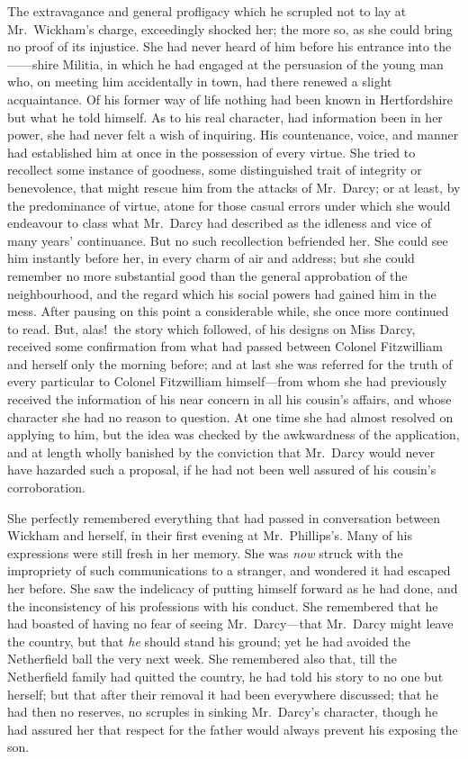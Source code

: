 \documentclass[12pt,english,oneside]{book}
\begin{document}
The extravagance and general profligacy which he scrupled not to lay
at Mr.\ Wickham's charge, exceedingly shocked her; the more so, as
she could bring no proof of its injustice. She had never heard of
him before his entrance into the \mbox{------}shire Militia, in which
he had engaged at the persuasion of the young man who, on meeting
him accidentally in town, had there renewed a slight acquaintance.
Of his former way of life nothing had been known in Hertfordshire
but what he told himself. As to his real character, had information
been in her power, she had never felt a wish of inquiring. His countenance,
voice, and manner had established him at once in the possession of
every virtue. She tried to recollect some instance of goodness, some
distinguished trait of integrity or benevolence, that might rescue
him from the attacks of Mr.\ Darcy; or at least, by the predominance
of virtue, atone for those casual errors under which she would endeavour
to class what Mr.\ Darcy had described as the idleness and vice of
many years' continuance. But no such recollection befriended her.
She could see him instantly before her, in every charm of air and
address; but she could remember no more substantial good than the
general approbation of the neighbourhood, and the regard which his
social powers had gained him in the mess. After pausing on this point
a considerable while, she once more continued to read. But, alas!\ the
story which followed, of his designs on Miss Darcy, received some
confirmation from what had passed between Colonel Fitzwilliam and
herself only the morning before; and at last she was referred for
the truth of every particular to Colonel Fitzwilliam himself\mbox{---}from
whom she had previously received the information of his near concern
in all his cousin's affairs, and whose character she had no reason
to question. At one time she had almost resolved on applying to him,
but the idea was checked by the awkwardness of the application, and
at length wholly banished by the conviction that Mr.\ Darcy would
never have hazarded such a proposal, if he had not been well assured
of his cousin's corroboration.

She perfectly remembered everything that had passed in conversation
between Wickham and herself, in their first evening at Mr.\ Phillips's.
Many of his expressions were still fresh in her memory. She was \textit{now}
struck with the impropriety of such communications to a stranger,
and wondered it had escaped her before. She saw the indelicacy of
putting himself forward as he had done, and the inconsistency of his
professions with his conduct. She remembered that he had boasted of
having no fear of seeing Mr.\ Darcy\mbox{---}that Mr.\ Darcy might
leave the country, but that \textit{he} should stand his ground; yet
he had avoided the Netherfield ball the very next week. She remembered
also that, till the Netherfield family had quitted the country, he
had told his story to no one but herself; but that after their removal
it had been everywhere discussed; that he had then no reserves, no
scruples in sinking Mr.\ Darcy's character, though he had assured
her that respect for the father would always prevent his exposing
the son.
\end{document}
